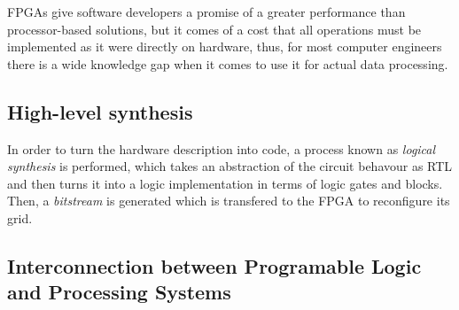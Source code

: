 FPGAs give software developers a promise of a greater performance than processor-based solutions, but it comes of a cost that all operations must be
implemented as it were directly on hardware, thus, for most computer engineers there is a wide knowledge gap when it comes to use it for actual data
processing.

\subsection{High-level synthesis}
In order to turn the hardware description into code, a process known as \emph{logical synthesis} is performed, which takes an abstraction of the circuit 
behavour as RTL and then turns it into a logic implementation in terms of logic gates and blocks. Then, a \emph{bitstream} is generated which is transfered
to the FPGA to reconfigure its grid.



\subsection{Interconnection between Programable Logic and Processing Systems}